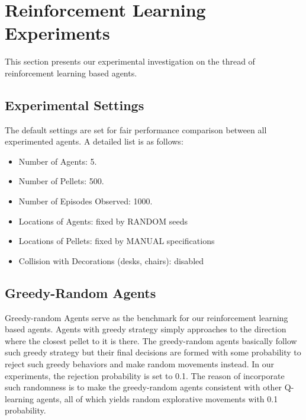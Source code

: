 \documentclass[conference]{IEEEtran}
\begin{document}
%
%
%

\section{Reinforcement Learning Experiments}
\label{section:rlexpo} 

This section presents our experimental investigation on the thread of reinforcement
learning based agents.

\subsection{Experimental Settings}
The default settings are set for fair performance comparison between all
experimented agents. A detailed list is as follows:
\begin{itemize}
    \item Number of Agents: 5.
    \item Number of Pellets: 500. 
    \item Number of Episodes Observed: 1000. 
    \item Locations of Agents: fixed by RANDOM seeds
    \item Locations of Pellets: fixed by MANUAL specifications
    \item Collision with Decorations (desks, chairs): disabled
\end{itemize}

\subsection{Greedy-Random Agents} 
Greedy-random Agents serve as the benchmark for our reinforcement
learning based agents.
Agents with greedy strategy simply approaches to the direction where the
closest pellet to it is there.
The greedy-random agents basically follow such greedy strategy but 
their final decisions are formed with some probability to reject such greedy
behaviors and make random movements instead. 
In our experiments, the rejection probability is set to 0.1.
The reason of incorporate such randomness is to make the greedy-random agents
consistent with other Q-learning agents, all of which yields random
explorative movements with 0.1 probability.
\end{document}
